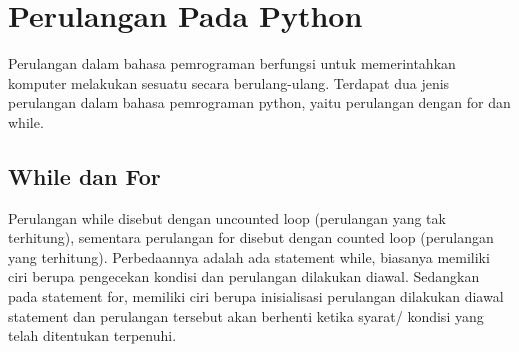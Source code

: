 \section{Perulangan Pada Python}
Perulangan dalam bahasa pemrograman berfungsi untuk memerintahkan komputer melakukan sesuatu secara berulang-ulang. Terdapat dua jenis perulangan dalam bahasa pemrograman python, yaitu perulangan dengan for dan while.
\subsection{While dan For}
Perulangan while disebut dengan uncounted loop (perulangan yang tak terhitung), sementara perulangan for disebut dengan counted loop (perulangan yang terhitung). Perbedaannya adalah ada statement while, biasanya memiliki ciri berupa pengecekan kondisi dan perulangan dilakukan diawal. Sedangkan pada statement for, memiliki ciri berupa inisialisasi perulangan dilakukan diawal statement dan perulangan tersebut akan berhenti ketika syarat/ kondisi yang telah ditentukan terpenuhi.\cite{santoso2009bahasa}
